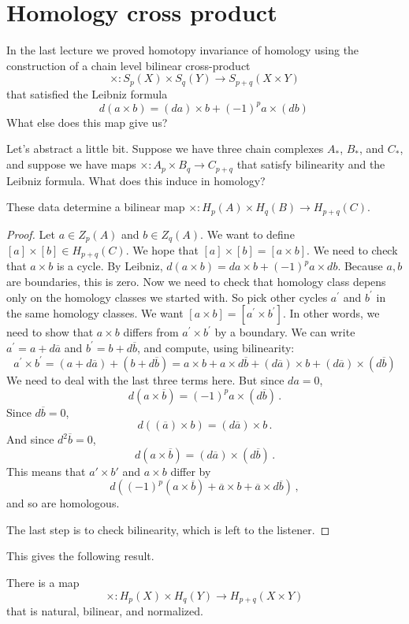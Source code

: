 \section{Homology cross product}

In the last lecture we proved homotopy invariance of homology using the
construction of a chain level bilinear cross-product
\[
\times:S_p(X)\times S_q(Y)\to S_{p+q}(X\times Y)
\]
that satisfied the Leibniz formula
\[
d(a\times b)=(da)\times b+(-1)^pa\times(db)\,
\]
What else does this map give us? 

Let's abstract a little bit. Suppose we have three chain complexes $A_*$, $B_*$, and $C_*$, and suppose we have maps $\times: A_p\times B_q\to C_{p+q}$ that satisfy bilinearity and the Leibniz formula. What does this induce in homology?
\begin{lemma}
These data determine a bilinear map $\times:H_p(A)\times H_q(B)\to H_{p+q}(C)$.
\end{lemma}
\begin{proof}
Let $a\in Z_p(A)$ and $b\in Z_q(A)$. We want to define $[a]\times [b]\in H_{p+q}(C)$. We hope that $[a]\times [b]=[a\times b]$. We need to check that $a\times b$ is a cycle. By Leibniz, $d(a\times b)=da\times b+(-1)^pa\times db$. Because $a,b$ are boundaries, this is zero. Now we need to check that homology class depens only on the homology classes we started with.
So pick other cycles $a^\prime$ and $b^\prime$ in the same homology classes. We want $[a\times b]=[a^\prime\times b^\prime]$. In other words, we need to show that $a\times b$ differs from $a^\prime\times b^\prime$ by a boundary. We can write $a^\prime=a+d\overline{a}$ and $b^\prime=b+d\overline{b}$, and compute, using bilinearity:
	\begin{equation*}
	a^\prime\times b^\prime=(a+d\overline{a})+(b+d\overline{b})
	= a\times b+a\times d\overline{b} + (d\overline{a})\times b+(d\overline{a})\times(d\overline{b})
	\end{equation*}
We need to deal with the last three terms here. But since $da=0$,
\[
d(a\times\overline b)=(-1)^pa\times(d\overline b)\,.
\]
Since $d\overline b=0$, 
\[
d((\overline a)\times b)=(d\overline a)\times b\,.
\]
And since $d^2\overline b=0$, 
\[ 
d(a\times\overline{b})=
(d\overline a)\times(d\overline{b})\,.
\]
This means that $a'\times b'$ and $a\times b$ differ by 
\[
d\left((-1)^p(a\times \overline{b}) + \overline{a}\times b + \overline{a}\times d\overline{b}\right)\,,
\]
and so are homologous. 

The last step is to check bilinearity, which is left to the listener.
\end{proof}
This gives the following result.
\begin{theorem}
There is a map 
\[
\times:H_p(X)\times H_q(Y)\to H_{p+q}(X\times Y)
\]
that is natural, bilinear, and normalized. 
\end{theorem}

